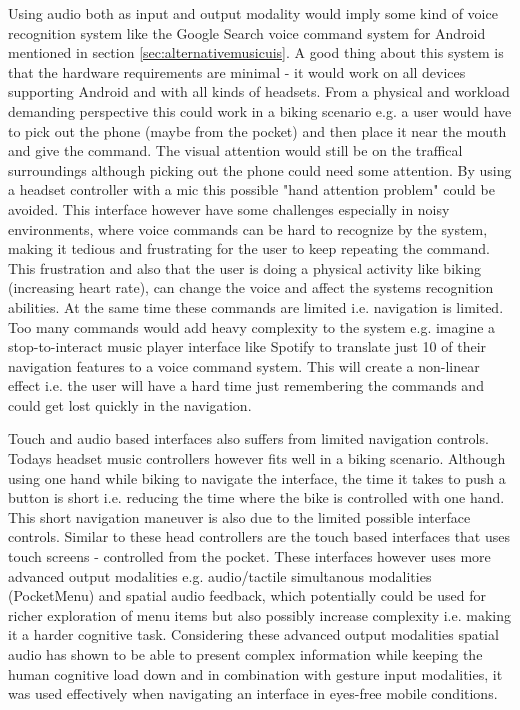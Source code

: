 Using audio both as input and output modality would imply some kind of voice recognition system like the Google Search voice command system for Android mentioned in section \ref{sec:alternativemusicuis}. A good thing about this system is that the hardware requirements are minimal - it would work on all devices supporting Android and with all kinds of headsets. From a physical and workload demanding perspective this could work in a biking scenario e.g. a user would have to pick out the phone (maybe from the pocket) and then place it near the mouth and give the command. The visual attention would still be on the traffical surroundings although picking out the phone could need some attention. By using a headset controller with a mic this possible "hand attention problem" could be avoided. This interface however have some challenges \cite{sawhney_nomadic_2000} especially in noisy environments, where voice commands can be hard to recognize by the system, making it tedious and frustrating for the user to keep repeating the command. This frustration and also that the user is doing a physical activity like biking (increasing heart rate), can change the voice and affect the systems recognition abilities. At the same time these commands are limited i.e. navigation is limited. Too many commands would add heavy complexity to the system e.g. imagine a stop-to-interact music player interface like Spotify to translate just 10 of their navigation features to a voice command system. This will create a non-linear effect i.e. the user will have a hard time just remembering the commands and could get lost quickly in the navigation.

Touch and audio based interfaces also suffers from limited navigation controls. Todays headset music controllers however fits well in a biking scenario. Although using one hand while biking to navigate the interface, the time it takes to push a button is short i.e. reducing the time where the bike is controlled with one hand. This short navigation maneuver is also due to the limited possible interface controls. Similar to these head controllers are the touch based interfaces that uses touch screens \cite{pielot_pocketmenu:_2012, pirhonen_gestural_2002} - controlled from the pocket. These interfaces however uses more advanced output modalities e.g. audio/tactile simultanous modalities (PocketMenu) and spatial audio feedback, which potentially could be used for richer exploration of menu items but also possibly increase complexity i.e. making it a harder cognitive task. Considering these advanced output modalities spatial audio has shown to be able to present complex information \cite{bronkhorst_cocktail_2000, gaver_sonicfinder:_1989} while keeping the human cognitive load down \cite{vazquez-alvarez_eyes-free_2011} and in combination with gesture input modalities, it was used effectively when navigating an interface in eyes-free mobile conditions. 

